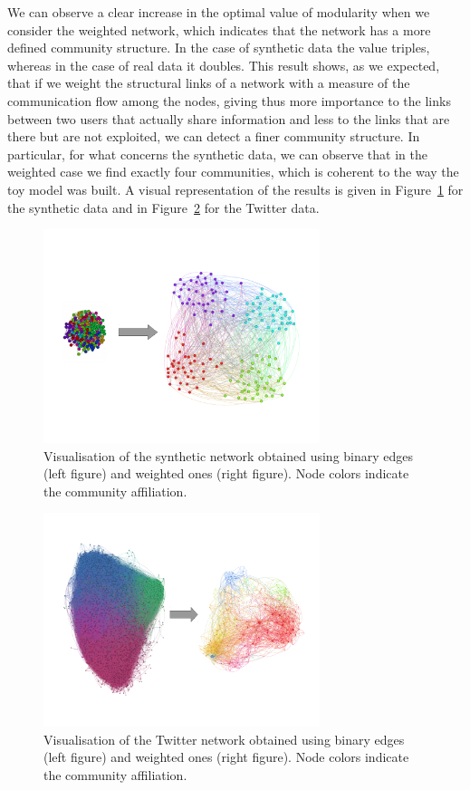 \documentclass[12pt]{article}
\begin{document}
We can observe a clear increase in the optimal value of modularity when we consider the weighted network, which indicates that the network has a more
defined community structure. In the case of synthetic data the value triples, whereas in the case of real data it doubles. This result shows, as we expected,
that if we weight the structural links of a network with a measure of the communication flow among the nodes, giving thus more importance to the links
between two users that actually share information and less to the links that are there but are not exploited, we can detect a finer community structure.
In particular, for what concerns the synthetic data, we can observe that in the weighted case we find exactly four communities, which is coherent to the way
the toy model was built. A visual representation of the results is given in Figure~\ref{networks_synthetic} for the synthetic data and in 
Figure~\ref{networks_twitter} for the Twitter data.

\begin{figure}[!ht]
\centering
\includegraphics[width=0.72\textwidth]{Figures/synthetic_data_networks.pdf}
\caption{Visualisation of the synthetic network obtained using binary edges (left figure) and weighted ones (right figure). Node colors indicate the
community affiliation.}
\label{networks_synthetic}
\end{figure}

\begin{figure}[!ht]
\centering
\includegraphics[width=0.72\textwidth]{Figures/twitter_data_networks.pdf}
\caption{Visualisation of the Twitter network obtained using binary edges (left figure) and weighted ones (right figure). Node colors indicate the
community affiliation.}
\label{networks_twitter}
\end{figure}
\end{document}
